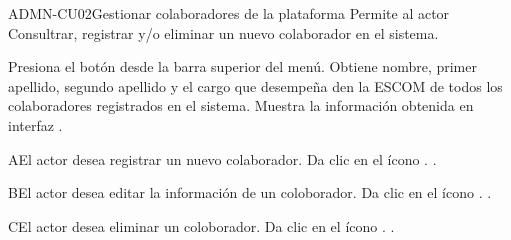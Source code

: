 \begin{UseCase}{ADMN-CU02}{Gestionar colaboradores de la plataforma}{
	Permite al actor Consultrar, registrar y/o eliminar un nuevo colaborador en el sistema.
}
	  

\end{UseCase}

\begin{UCtrayectoria}
	\UCpaso [\UCactor] Presiona el botón  desde la barra superior del menú.
	\UCpaso [\UCsist] Obtiene nombre, primer apellido, segundo apellido y el cargo que desempeña den la ESCOM de todos los colaboradores registrados en el sistema. 
    \UCpaso [\UCsist] Muestra la información obtenida en interfaz .
	
\end{UCtrayectoria}

\begin{UCtrayectoriaA}{A}{El actor desea registrar un nuevo colaborador.}
	\UCpaso [\UCactor] Da clic en el ícono \IUAgregar{}.
	.
\end{UCtrayectoriaA} 

\begin{UCtrayectoriaA}{B}{El actor desea editar la información de  un coloborador.}
	\UCpaso [\UCactor] Da clic en el ícono \IUEditar{}.
	.
\end{UCtrayectoriaA} 

\begin{UCtrayectoriaA}{C}{El actor desea eliminar un coloborador.}
	\UCpaso [\UCactor] Da clic en el ícono \IUEliminar{}.
	.
\end{UCtrayectoriaA} 
